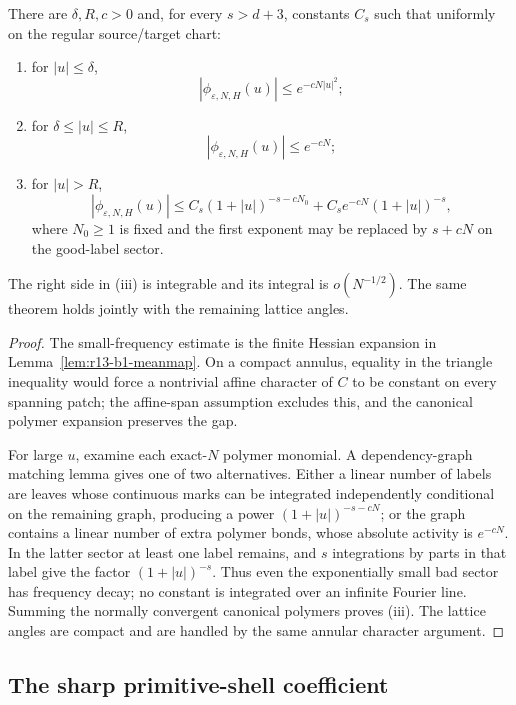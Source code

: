 \begin{theorem}
\label{thm:r13-b1-fourier}
There are $\delta,R,c>0$ and, for every $s>d+3$, constants $C_s$ such that
uniformly on the regular source/target chart:
\begin{enumerate}[label=(\roman*)]
\item for $|u|\le\delta$,
\[
 |\phi_{\varepsilon,N,H}(u)|
 \le e^{-cN|u|^2};
\]
\item for $\delta\le|u|\le R$,
\[
 |\phi_{\varepsilon,N,H}(u)|\le e^{-cN};
\]
\item for $|u|>R$,
\[
 |\phi_{\varepsilon,N,H}(u)|
 \le C_s(1+|u|)^{-s-cN_0}
      +C_se^{-cN}(1+|u|)^{-s},
\]
where $N_0\ge1$ is fixed and the first exponent may be replaced by
$s+cN$ on the good-label sector.
\end{enumerate}
The right side in (iii) is integrable and its integral is $o(N^{-1/2})$.
The same theorem holds jointly with the remaining lattice angles.
\end{theorem}

\begin{proof}
The small-frequency estimate is the finite Hessian expansion in
Lemma~\ref{lem:r13-b1-meanmap}.  On a compact annulus, equality in the
triangle inequality would force a nontrivial affine character of $C$ to be
constant on every spanning patch; the affine-span assumption excludes this,
and the canonical polymer expansion preserves the gap.

For large $u$, examine each exact-$N$ polymer monomial.  A dependency-graph
matching lemma gives one of two alternatives.  Either a linear number of
labels are leaves whose continuous marks can be integrated independently
conditional on the remaining graph, producing a power
$(1+|u|)^{-s-cN}$; or the graph contains a linear number of extra polymer
bonds, whose absolute activity is $e^{-cN}$.  In the latter sector at least
one label remains, and $s$ integrations by parts in that label give the factor
$(1+|u|)^{-s}$.  Thus even the exponentially small bad sector has frequency
decay; no constant is integrated over an infinite Fourier line.  Summing the
normally convergent canonical polymers proves (iii).  The lattice angles are
compact and are handled by the same annular character argument.
\end{proof}

\subsection{The sharp primitive-shell coefficient}

